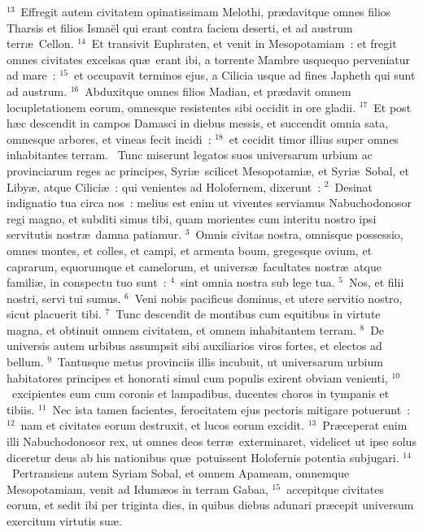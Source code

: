 ${}^{13}$~Effregit autem civitatem opinatissimam Melothi, pr\ae davitque omnes filios Tharsis et filios Isma\"el qui erant contra faciem deserti, et ad austrum terr\ae\ Cellon.
${}^{14}$~Et transivit Euphraten, et venit in Mesopotamiam~: et fregit omnes civitates excelsas qu\ae\ erant ibi, a torrente Mambre usquequo perveniatur ad mare~:
${}^{15}$~et occupavit terminos ejus, a Cilicia usque ad fines Japheth qui sunt ad austrum.
${}^{16}$~Abduxitque omnes filios Madian, et pr\ae davit omnem locupletationem eorum, omnesque resistentes sibi occidit in ore gladii.
${}^{17}$~Et post h\ae c descendit in campos Damasci in diebus messis, et succendit omnia sata, omnesque arbores, et vineas fecit incidi~:
${}^{18}$~et cecidit timor illius super omnes inhabitantes terram.
~Tunc miserunt legatos suos universarum urbium ac provinciarum reges ac principes, Syri\ae\ scilicet Mesopotami\ae , et Syri\ae\ Sobal, et Liby\ae , atque Cilici\ae~: qui venientes ad Holofernem, dixerunt~:
${}^{2}$~Desinat indignatio tua circa nos~: melius est enim ut viventes serviamus Nabuchodonosor regi magno, et subditi simus tibi, quam morientes cum interitu nostro ipsi servitutis nostr\ae\ damna patiamur.
${}^{3}$~Omnis civitas nostra, omnisque possessio, omnes montes, et colles, et campi, et armenta boum, gregesque ovium, et caprarum, equorumque et camelorum, et univers\ae\ facultates nostr\ae\ atque famili\ae , in conspectu tuo sunt~:
${}^{4}$~sint omnia nostra sub lege tua.
${}^{5}$~Nos, et filii nostri, servi tui sumus.
${}^{6}$~Veni nobis pacificus dominus, et utere servitio nostro, sicut placuerit tibi.
${}^{7}$~Tunc descendit de montibus cum equitibus in virtute magna, et obtinuit omnem civitatem, et omnem inhabitantem terram.
${}^{8}$~De universis autem urbibus assumpsit sibi auxiliarios viros fortes, et electos ad bellum.
${}^{9}$~Tantusque metus provinciis illis incubuit, ut universarum urbium habitatores principes et honorati simul cum populis exirent obviam venienti,
${}^{10}$~excipientes eum cum coronis et lampadibus, ducentes choros in tympanis et tibiis.
${}^{11}$~Nec ista tamen facientes, ferocitatem ejus pectoris mitigare potuerunt~:
${}^{12}$~nam et civitates eorum destruxit, et lucos eorum excidit.
${}^{13}$~Pr\ae ceperat enim illi Nabuchodonosor rex, ut omnes deos terr\ae\ exterminaret, videlicet ut ipse solus diceretur deus ab his nationibus qu\ae\ potuissent Holofernis potentia subjugari.
${}^{14}$~Pertransiens autem Syriam Sobal, et omnem Apameam, omnemque Mesopotamiam, venit ad Idum\ae os in terram Gabaa,
${}^{15}$~accepitque civitates eorum, et sedit ibi per triginta dies, in quibus diebus adunari pr\ae cepit universum exercitum virtutis su\ae .
